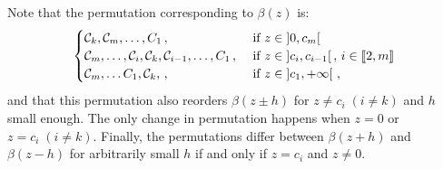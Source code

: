 \begin{remark}
  Note  that the permutation corresponding to $\beta(z)$ is:
  \begin{equation*}
    \begin{cases}
    \mathcal{C}_k, \mathcal{C}_m, \ldots, C_1 \, ,
        &\text{ if } z \in \left]0, c_m\right[ \, \\
    \mathcal{C}_m, \ldots ,\mathcal{C}_i, \mathcal{C}_k, \mathcal{C}_{i-1}, \ldots, C_1 \, ,
        &\text{ if } z \in \left]c_{i}, c_{i-1} \right[, \, i \in \llbracket 2 , m \rrbracket \, \\
    \mathcal{C}_m, \ldots C_1,  \mathcal{C}_k, \, ,
        &\text{ if } z \in \left]c_1, +\infty \right[ \, , \\
    \end{cases}
  \end{equation*}
  and that this permutation also reorders $\beta(z \pm h)$ for $z \neq c_i \; (i \neq k)$ and $h$ small enough.
  The only change in permutation happens when $z = 0$ or $z = c_i \; (i \neq k)$.
  Finally, the permutations differ between $\beta(z + h)$ and $\beta(z - h)$ for arbitrarily small $h$ if and only if $z = c_i$ and $z \neq 0$.
\end{remark}

